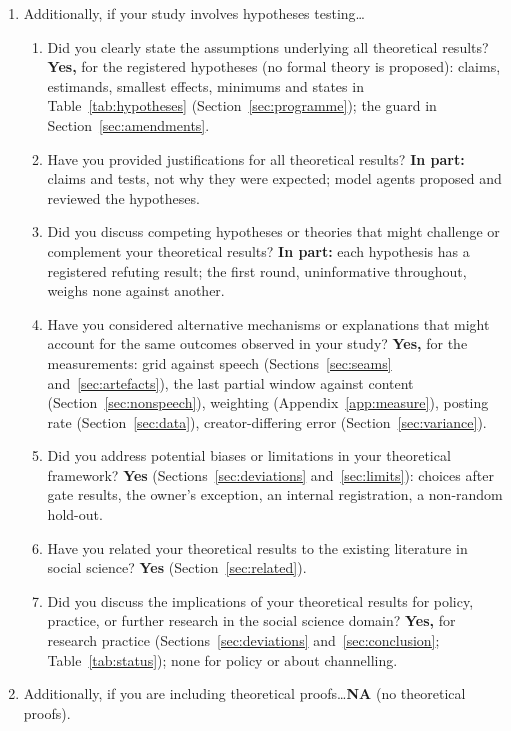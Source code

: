 {\begin{enumerate}
\item Additionally, if your study involves hypotheses testing\ldots
\begin{enumerate}
\item Did you clearly state the assumptions underlying all theoretical results? \textbf{Yes,} for the registered hypotheses (no formal theory is proposed): claims, estimands, smallest effects, minimums and states in Table~\ref{tab:hypotheses} (Section~\ref{sec:programme}); the guard in Section~\ref{sec:amendments}.
\item Have you provided justifications for all theoretical results? \textbf{In part:} claims and tests, not why they were expected; model agents proposed and reviewed the hypotheses.
\item Did you discuss competing hypotheses or theories that might challenge or complement your theoretical results? \textbf{In part:} each hypothesis has a registered refuting result; the first round, uninformative throughout, weighs none against another.
\item Have you considered alternative mechanisms or explanations that might account for the same outcomes observed in your study? \textbf{Yes,} for the measurements: grid against speech (Sections~\ref{sec:seams} and~\ref{sec:artefacts}), the last partial window against content (Section~\ref{sec:nonspeech}), weighting (Appendix~\ref{app:measure}), posting rate (Section~\ref{sec:data}), creator-differing error (Section~\ref{sec:variance}).
\item Did you address potential biases or limitations in your theoretical framework? \textbf{Yes} (Sections~\ref{sec:deviations} and~\ref{sec:limits}): choices after gate results, the owner's exception, an internal registration, a non-random hold-out.
\item Have you related your theoretical results to the existing literature in social science? \textbf{Yes} (Section~\ref{sec:related}).
\item Did you discuss the implications of your theoretical results for policy, practice, or further research in the social science domain? \textbf{Yes,} for research practice (Sections~\ref{sec:deviations} and~\ref{sec:conclusion}; Table~\ref{tab:status}); none for policy or about channelling.
\end{enumerate}

\item Additionally, if you are including theoretical proofs\ldots \textbf{NA} (no theoretical proofs).


\end{enumerate}}
